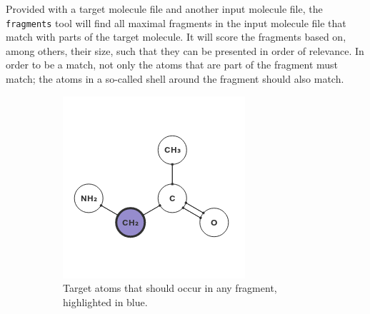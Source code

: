 Provided with a target molecule file and another input molecule file, the \verb|fragments| tool will find all maximal fragments in the input molecule file that match with parts of the target molecule. It will score the fragments based on, among others, their size, such that they can be presented in order of relevance. In order to be a match, not only the atoms that are part of the fragment must match; the atoms in a so-called shell around the fragment should also match.

\begin{figure}
\centering
\begin{subfigure}[t]{0.29\textwidth}
\centering
\includegraphics[width=\textwidth]{img/shell_1.png}
\caption{Target atoms that should occur in any fragment, highlighted in blue.}
\end{subfigure}%
\qquad
\begin{subfigure}[t]{0.29\textwidth}
\centering

\end{subfigure}
\end{figure}
